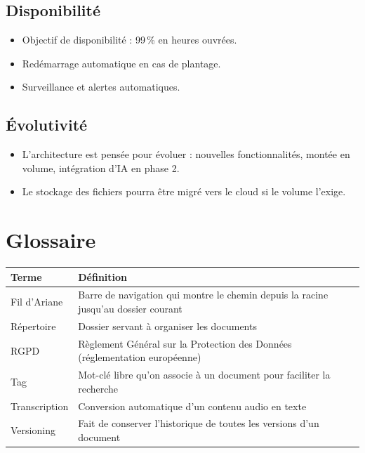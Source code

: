 \documentclass[a4paper,12pt,french]{article}
\begin{document}
\subsection{Disponibilité}

\begin{itemize}[leftmargin=1.5em]
  \item Objectif de disponibilité : 99\,\% en heures ouvrées.
  \item Redémarrage automatique en cas de plantage.
  \item Surveillance et alertes automatiques.
\end{itemize}

\subsection{Évolutivité}

\begin{itemize}[leftmargin=1.5em]
  \item L'architecture est pensée pour évoluer : nouvelles fonctionnalités, montée en volume, intégration d'IA en phase 2.
  \item Le stockage des fichiers pourra être migré vers le cloud si le volume l'exige.
\end{itemize}


\section{Glossaire}

\begin{tabularx}{\textwidth}{l X}
\toprule
\textbf{Terme} & \textbf{Définition} \\
\midrule
Fil d'Ariane & Barre de navigation qui montre le chemin depuis la racine jusqu'au dossier courant \\
Répertoire & Dossier servant à organiser les documents \\
RGPD & Règlement Général sur la Protection des Données (réglementation européenne) \\
Tag & Mot-clé libre qu'on associe à un document pour faciliter la recherche \\
Transcription & Conversion automatique d'un contenu audio en texte \\
Versioning & Fait de conserver l'historique de toutes les versions d'un document \\
\bottomrule
\end{tabularx}
\end{document}
